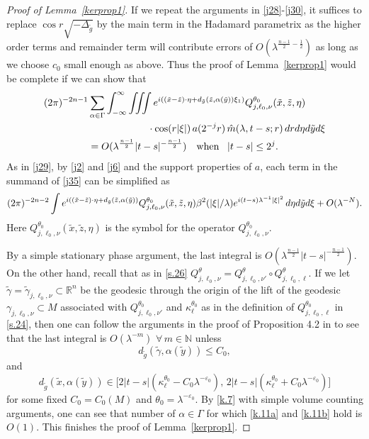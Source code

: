 \documentclass[10pt]{amsart}
\newcommand{\Rn}{{\mathbb R}^n}
\newcommand{\la}{\lambda}
\newcommand{\e}{\varepsilon}
\newcommand{\1}{{\bf 1}}
\begin{document}
\begin{proof}[Proof of Lemma~\ref{kerprop1}]
If we repeat the arguments in \eqref{j28}-\eqref{j30}, it suffices to replace $ \cos r\sqrt{-\Delta_{\tilde g}}$ by the main term in the Hadamard parametrix as the higher order terms and remainder term will contribute errors of
 $O(\la^{\frac{n-1}2-\frac12})$ as long as we choose $c_0$ small enough as above. Thus the proof of Lemma~\ref{kerprop1}  would be complete if we can show that
 \begin{equation}\label{j35}
     \begin{aligned}
     (2\pi)^{-2n-1} &\sum_{\alpha \in \Gamma}\int_{-\infty}^\infty \iiint e^{i((\tilde x-\tilde z)\cdot \eta+ d_{\tilde g}(\tilde z,\alpha(\tilde y))\xi_1)}  Q^{\theta_0}_{j, \ell_0, \nu}(\tilde x,\tilde z,\eta)\\
         &\qquad\qquad\qquad\cdot
\cos (r|\xi|) \, a(2^{-j}r) \, \Hat m(\la,t-s;r) \, dr d\eta  d\tilde yd\xi \\ &
=O(\la^{\frac{n-1}2}|t-s|^{-\frac{n-1}2}) \quad
\text{when }\,\,\, |t-s|\le 2^j .
     \end{aligned}
 \end{equation}
As in \eqref{j29}, 
by \eqref{j2} and \eqref{j6} and the support properties of $a$, each term in the summand of \eqref{j35} can be simplified as 
\begin{align}\label{j36}
(2\pi)^{-2n-2}\int e^{i((\tilde x-\tilde z)\cdot \eta+ d_{\tilde g}(\tilde z,\alpha(\tilde y))}Q^{\theta_0}_{j, \ell_0, \nu}(\tilde x,\tilde z,\eta)\beta^2(|\xi|/\la) e^{i(t-s)\la^{-1}|\xi|^2} \, d\eta  d\tilde yd\xi
+O(\la^{-N}). \notag
\end{align}
Here $Q^{\theta_0}_{j, \ell_0, \nu}(\tilde x,\tilde z,\eta)$ is the symbol for the operator $Q^{\theta_0}_{j, \ell_0, \nu}$.  


By a simple stationary phase argument, the last integral is $O(\la^{\frac{n-1}2}|t-s|^{-\frac{n-1}2})$. On the other hand, 
recall that as in \eqref{s.26}
$Q^\theta_{j, \ell_0, \nu}=Q^\theta_{j,\ell_0, \nu'}\circ Q^\theta_{j,\ell_0, \ell}.$  If we let $\tilde \gamma =\tilde \gamma_{j,\ell_0,\nu}\subset \Rn$
be the geodesic through the origin of the lift of the geodesic $\gamma_{j,\ell_0,\nu}\subset M$ associated
with $Q^{\theta_0}_{j,\ell_0,\nu'}$ and $\kappa^{\theta_0}_\ell$ as in the definition of $Q^{\theta_0}_{j,\ell_0, \ell}$ in \eqref{s.24},  then
one can follow the arguments in the proof of Proposition 4.2 in \cite{blair2023strichartz} to see that the last integral is $O(\la^{-m}) \, \,
\forall \, m\in {\mathbb N}$ unless
\begin{equation}\label{k.11a}
d_{\tilde g}(\tilde \gamma, \alpha(\tilde y))\le C_0,
\end{equation}
and
\begin{equation}\label{k.11b}
    d_{\tilde g}(\tilde x, \alpha(\tilde y))\in
\bigl[ 2|t-s|(\kappa^{\theta_0}_\ell-C_0\la^{-\e_0}), \,
2|t-s|(\kappa^{\theta_0}_\ell+C_0\la^{-\e_0})\big]
\end{equation}
for some fixed $C_0=C_0(M)$ and $\theta_0=\la^{-\e_0}$. By \eqref{k.7} with simple volume counting arguments, one can see
that number of $\alpha\in \Gamma$ for which \eqref{k.11a} and \eqref{k.11b} hold is $O(1)$. This finishes the proof of Lemma~\ref{kerprop1}.
\end{proof}
\end{document}
